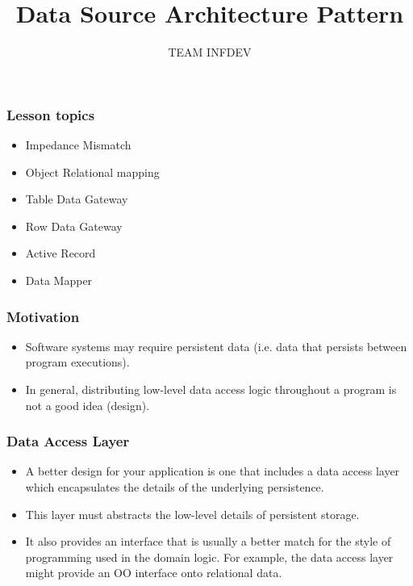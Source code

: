 \documentclass{beamer}
\title{Data Source Architecture Pattern}
\author{TEAM INFDEV}
\institute{Hogeschool Rotterdam \\ 
	Rotterdam, Netherlands}
\date{}
\begin{document}
\maketitle


\begin{frame}
	\frametitle{Lesson topics}
	\begin{itemize}
		\item Impedance Mismatch
		\item Object Relational mapping
		\item Table Data Gateway
		\item Row Data Gateway
		\item Active Record
		\item Data Mapper
	\end{itemize}
\end{frame}


\begin{frame}
	\frametitle{Motivation}
	\begin{itemize}
	\item Software systems may require persistent data (i.e. data 	that persists between program executions).
	\item In general, distributing low-level data access logic throughout a program is not a good idea (design).
	\end{itemize}
\end{frame}	
	
\begin{frame}
	\frametitle{Data Access Layer}
	\begin{itemize}
	\item A better design for your application is one that includes a data access layer which encapsulates the details of the underlying persistence.
	\item This layer must abstracts the low-level details of persistent storage.
	\item It also provides an interface that is usually a better match for the style of programming used in the domain logic. For example, the data access layer might provide an OO interface onto relational data.
	\end{itemize}
	\begin{figure}
	\end{figure}
\end{frame}	
\end{document}
